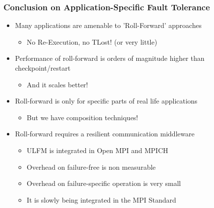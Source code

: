 \begin{frame}
  \frametitle{Conclusion on Application-Specific Fault Tolerance}

  \begin{itemize}
  \item Many applications are amenable to 'Roll-Forward' approaches
    \begin{itemize}
    \item No Re-Execution, no TLost! (or very little)
    \end{itemize}
  \item Performance of roll-forward is orders of magnitude higher than checkpoint/restart
    \begin{itemize}
    \item And it scales better!
    \end{itemize}
  \item Roll-forward is only for specific parts of real life applications
    \begin{itemize}
    \item But we have composition techniques!
    \end{itemize}
  \item Roll-forward requires a resilient communication middleware
    \begin{itemize}
    \item ULFM is integrated in Open MPI and MPICH
    \item Overhead on failure-free is non measurable
    \item Overhead on failure-specific operation is very small
    \item It is slowly being integrated in the MPI Standard
    \end{itemize}
  \end{itemize}
  
\end{frame}


